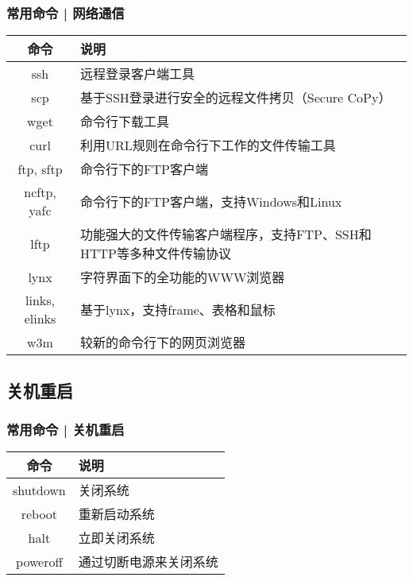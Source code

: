 \begin{frame}[fragile]
  \frametitle{常用命令 | 网络通信}
  \begin{table}
    \centering
    \begin{tabularx}{0.9\textwidth}{cX}
      \hline
      \rowcolor{blue!50}命令 & 说明\\
      \hline
      ssh & 远程登录客户端工具\\
      scp & \footnotesize{基于SSH登录进行安全的远程文件拷贝（Secure CoPy）}\\
      wget & 命令行下载工具\\
      curl & 利用URL规则在命令行下工作的文件传输工具\\
      \hline
      ftp, sftp & 命令行下的FTP客户端\\
      ncftp, yafc & 命令行下的FTP客户端，支持Windows和Linux\\
      lftp & 功能强大的文件传输客户端程序，支持FTP、SSH和HTTP等多种文件传输协议\\
      \hline
      lynx & 字符界面下的全功能的WWW浏览器\\
      links, elinks & 基于lynx，支持frame、表格和鼠标\\
      w3m & 较新的命令行下的网页浏览器\\
      \hline
    \end{tabularx}
  \end{table}
\end{frame}

\subsection{关机重启}
\begin{frame}
  \frametitle{常用命令 | \alert{关机重启}}
  \begin{table}
    \centering
    \begin{tabularx}{0.9\textwidth}{cX}
      \hline
      \rowcolor{blue!50}命令 & 说明\\
      \hline
      shutdown & 关闭系统\\
      reboot & 重新启动系统\\
      halt & 立即关闭系统\\
      poweroff & 通过切断电源来关闭系统\\
      \hline
    \end{tabularx}
  \end{table}
\end{frame}

